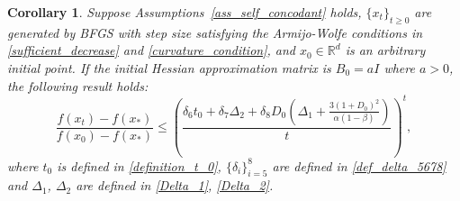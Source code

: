 \documentclass[11pt,letterpaper]{article}
\newcommand\0{{\Vector{0}}}
\newcommand\1{{\Vector{1}}}
\newtheorem{corollary}[theorem]{Corollary}
\numberwithin{assumption}{section}
\numberwithin{definition}{section}
\numberwithin{theorem}{section}
\numberwithin{remark}{section}
\begin{document}
\begin{corollary}\label{coro:superlinear_rate}
Suppose Assumptions~\ref{ass_self_concodant} holds, $\{x_t\}_{t\geq 0}$  are generated by BFGS with step size satisfying the Armijo-Wolfe conditions in \eqref{sufficient_decrease} and \eqref{curvature_condition}, and $x_0 \in \mathbb{R}^{d}$ is an arbitrary initial point. If the initial Hessian approximation matrix is $B_0 = a I$ where $a > 0$, the following result holds:
\begin{equation*}
 \frac{f(x_t) \!-\! f(x_*)}{f(x_0)\! -\! f(x_*)} 
     \!\leq \!\left(\!\frac{\delta_6 t_0 \!+\! \delta_7 \Delta_2 \!+\! \delta_8 D_0 (\Delta_1 \!+\! \frac{3(1 + D_0)^2}{\alpha(1 - \beta)})}{t}\!\right)^{\!\!t}\!,
\end{equation*}
where $t_0$ is defined in \eqref{definition_t_0}, $\{\delta_i\}_{i = 5}^{8}$ are defined in \eqref{def_delta_5678} and $\Delta_1$, $\Delta_2$ are defined in \eqref{Delta_1}, \eqref{Delta_2}.
\end{corollary}


\end{document}
